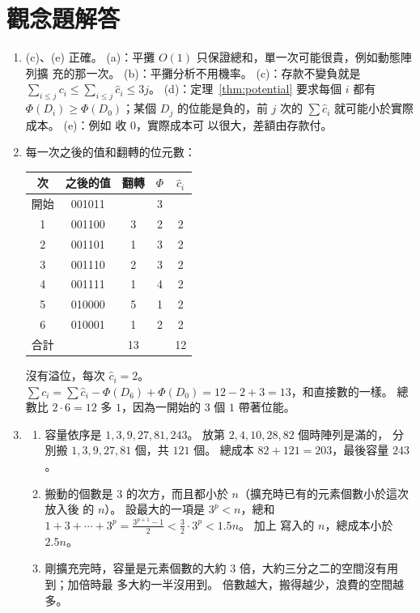 \section*{觀念題解答}

\begin{enumerate}
\item (c)、(e) 正確。 (a)：平攤 $O(1)$ 只保證總和，單一次可能很貴，例如動態陣列擴
充的那一次。 (b)：平攤分析不用機率。 (c)：存款不變負就是 $\sum_{i \le j} c_i \le
\sum_{i \le j} \hat{c}_i \le 3j$。 (d)：定理~\ref{thm:potential} 要求每個 $i$ 都有
$\Phi(D_i) \ge \Phi(D_0)$；某個 $D_j$ 的位能是負的，前 $j$ 次的
$\sum \hat{c}_i$ 就可能小於實際成本。 (e)：例如  收 $0$，實際成本可
以很大，差額由存款付。

\item 每一次之後的值和翻轉的位元數：
\begin{center}
\begin{tabular}{ccccc}
\toprule
次 & 之後的值 & 翻轉 & $\Phi$ & $\hat{c}_i$ \\
\midrule
開始 & 001011 & & 3 & \\
1 & 001100 & 3 & 2 & 2 \\
2 & 001101 & 1 & 3 & 2 \\
3 & 001110 & 2 & 3 & 2 \\
4 & 001111 & 1 & 4 & 2 \\
5 & 010000 & 5 & 1 & 2 \\
6 & 010001 & 1 & 2 & 2 \\
\midrule
合計 & & 13 & & 12 \\
\bottomrule
\end{tabular}
\end{center}
沒有溢位，每次 $\hat{c}_i = 2$。 $\sum c_i = \sum \hat{c}_i - \Phi(D_6) + \Phi(D_0)
= 12 - 2 + 3 = 13$，和直接數的一樣。 總數比 $2 \cdot 6 = 12$ 多 $1$，因為一開始的
$3$ 個 $1$ 帶著位能。

\item
\begin{enumerate}
\item 容量依序是 $1, 3, 9, 27, 81, 243$。 放第 $2, 4, 10, 28, 82$ 個時陣列是滿的，
分別搬 $1, 3, 9, 27, 81$ 個，共 $121$ 個。 總成本 $82 + 121 = 203$，最後容量 $243$。
\item 搬動的個數是 $3$ 的次方，而且都小於 $n$（擴充時已有的元素個數小於這次放入後
的 $n$）。 設最大的一項是 $3^p < n$，總和
$1 + 3 + \cdots + 3^p = \frac{3^{p+1} - 1}{2} < \frac{3}{2} \cdot 3^p < 1.5n$。 加上
寫入的 $n$，總成本小於 $2.5n$。
\item 剛擴充完時，容量是元素個數的大約 $3$ 倍，大約三分之二的空間沒有用到；加倍時最
多大約一半沒用到。 倍數越大，搬得越少，浪費的空間越多。
\end{enumerate}


\end{enumerate}
